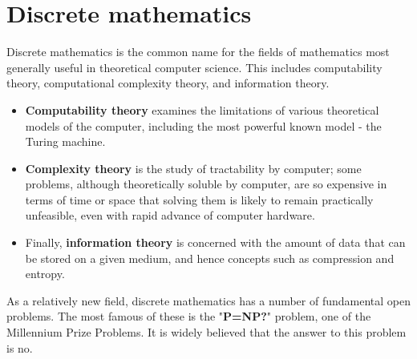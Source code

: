 \documentclass[]{article}
\title{}
\author{}
\begin{document}
\section{Discrete mathematics}


Discrete mathematics is the common name for the fields of mathematics most generally useful in theoretical computer science. This includes computability theory, computational complexity theory, and information theory. 
\begin{itemize}
\item \textbf{Computability theory} examines the limitations of various theoretical models of the computer, including the most powerful known model - the Turing machine. 

\item \textbf{Complexity theory} is the study of tractability by computer; some problems, although theoretically soluble by computer, are so expensive in terms of time or space that solving them is likely to remain practically unfeasible, even with rapid advance of computer hardware. 

\item Finally, \textbf{information theory} is concerned with the amount of data that can be stored on a given medium, and hence concepts such as compression and entropy.
\end{itemize}


As a relatively new field, discrete mathematics has a number of fundamental open problems. The most famous of these is the "\textbf{P=NP?}" problem, one of the Millennium Prize Problems. It is widely believed that the answer to this problem is no.
\end{document}
